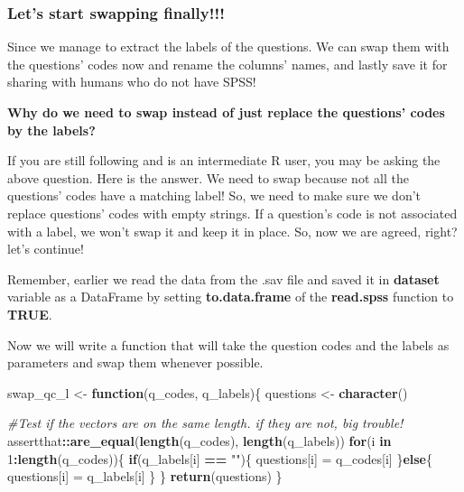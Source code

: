 \documentclass[]{article}
\newenvironment{Shaded}{\begin{snugshade}}{\end{snugshade}}
\newcommand{\CommentTok}[1]{\textcolor[rgb]{0.56,0.35,0.01}{\textit{#1}}}
\newcommand{\ControlFlowTok}[1]{\textcolor[rgb]{0.13,0.29,0.53}{\textbf{#1}}}
\newcommand{\DecValTok}[1]{\textcolor[rgb]{0.00,0.00,0.81}{#1}}
\newcommand{\KeywordTok}[1]{\textcolor[rgb]{0.13,0.29,0.53}{\textbf{#1}}}
\newcommand{\NormalTok}[1]{#1}
\newcommand{\OperatorTok}[1]{\textcolor[rgb]{0.81,0.36,0.00}{\textbf{#1}}}
\newcommand{\StringTok}[1]{\textcolor[rgb]{0.31,0.60,0.02}{#1}}
\begin{document}
\hypertarget{lets-start-swapping-finally}{%
\subsubsection{Let's start swapping
finally!!!}\label{lets-start-swapping-finally}}

Since we manage to extract the labels of the questions. We can swap them
with the questions' codes now and rename the columns' names, and lastly
save it for sharing with humans who do not have SPSS!

\textbf{Why do we need to swap instead of just replace the questions'
codes by the labels?}

If you are still following and is an intermediate R user, you may be
asking the above question. Here is the answer. We need to swap because
not all the questions' codes have a matching label! So, we need to make
sure we don't replace questions' codes with empty strings. If a
question's code is not associated with a label, we won't swap it and
keep it in place. So, now we are agreed, right? let's continue!

Remember, earlier we read the data from the .sav file and saved it in
\textbf{dataset} variable as a DataFrame by setting
\textbf{to.data.frame} of the \textbf{read.spss} function to
\textbf{TRUE}.

Now we will write a function that will take the question codes and the
labels as parameters and swap them whenever possible.

\begin{Shaded}
\begin{Highlighting}[]
\NormalTok{swap_qc_l <-}\StringTok{ }\ControlFlowTok{function}\NormalTok{(q_codes, q_labels)\{}
\NormalTok{  questions <-}\StringTok{ }\KeywordTok{character}\NormalTok{()}
  
  \CommentTok{#Test if the vectors are on the same length. if they are not, big trouble!}
\NormalTok{  assertthat}\OperatorTok{::}\KeywordTok{are_equal}\NormalTok{(}\KeywordTok{length}\NormalTok{(q_codes), }\KeywordTok{length}\NormalTok{(q_labels))  }
  \ControlFlowTok{for}\NormalTok{(i }\ControlFlowTok{in} \DecValTok{1}\OperatorTok{:}\KeywordTok{length}\NormalTok{(q_codes))\{}
    \ControlFlowTok{if}\NormalTok{(q_labels[i] }\OperatorTok{==}\StringTok{ ""}\NormalTok{)\{}
\NormalTok{      questions[i] =}\StringTok{ }\NormalTok{q_codes[i]}
\NormalTok{    \}}\ControlFlowTok{else}\NormalTok{\{}
\NormalTok{      questions[i] =}\StringTok{ }\NormalTok{q_labels[i]}
\NormalTok{    \}}
\NormalTok{  \}}
  \KeywordTok{return}\NormalTok{(questions)}
\NormalTok{\}}
\end{Highlighting}
\end{Shaded}
\end{document}
